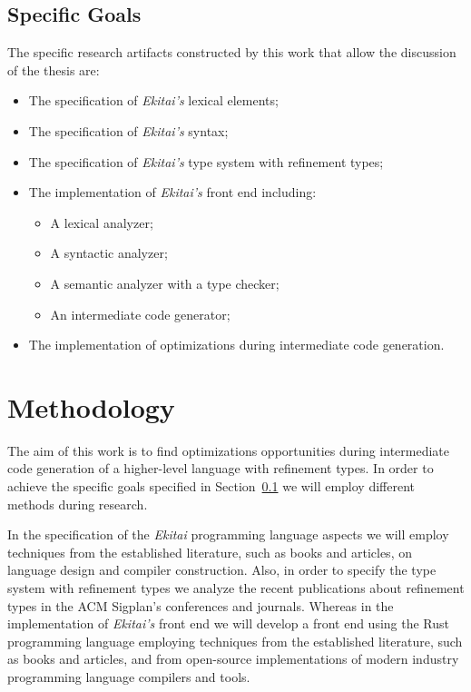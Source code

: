 \documentclass[
    oneside,
    english,
    embeddedlogo,
    noabntexcite
]{ufsc-thesis-rn46-2019}
\begin{document}
\subsection{Specific Goals}\label{chapter:introduction:sec:goals:specific_goals}
The specific research artifacts constructed by this work that allow the discussion of the thesis are:
\begin{itemize}
    \item The specification of \textit{Ekitai's} lexical elements;
    \item The specification of \textit{Ekitai's} syntax;
    \item The specification of \textit{Ekitai's} type system with refinement types;
    \item The implementation of \textit{Ekitai's} front end including:
          \begin{itemize}
              \item A lexical analyzer;
              \item A syntactic analyzer;
              \item A semantic analyzer with a type checker;
              \item An intermediate code generator;
          \end{itemize}
    \item The implementation of optimizations during intermediate code generation.
\end{itemize}

\section{Methodology}

The aim of this work is to find optimizations opportunities during intermediate code generation of a higher-level language with refinement types.
In order to achieve the specific goals specified in Section~\ref{chapter:introduction:sec:goals:specific_goals} we will employ different methods during research.

In the specification of the \textit{Ekitai} programming language aspects we will employ techniques from the established literature, such as books and articles, on language design and compiler construction.
Also, in order to specify the type system with refinement types we analyze the recent publications about refinement types in the ACM Sigplan's conferences and journals.
Whereas in the implementation of \textit{Ekitai's} front end we will develop a front end using the Rust programming language employing techniques from the established literature, such as books and articles, and from open-source implementations of modern industry programming language compilers and tools.
\end{document}
